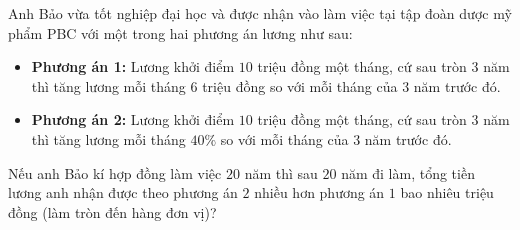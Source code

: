 \begin{ex}%
	Anh Bảo vừa tốt nghiệp đại học và được nhận vào làm việc tại tập đoàn dược mỹ phẩm PBC với một trong hai phương án lương như sau:
	\begin{itemize}
		\item \textbf{Phương án 1:} Lương khởi điểm $10$ triệu đồng một tháng, cứ sau tròn $3$ năm thì tăng lương mỗi tháng $6$ triệu đồng so với mỗi tháng của $3$ năm trước đó.
		\item \textbf{Phương án 2:} Lương khởi điểm $10$ triệu đồng một tháng, cứ sau tròn $3$ năm thì tăng lương mỗi tháng $40\%$ so với mỗi tháng của $3$ năm trước đó.
	\end{itemize}
	Nếu anh Bảo kí hợp đồng làm việc $20$ năm thì sau $20$ năm đi làm, tổng tiền lương anh nhận được theo phương án $2$ nhiều hơn phương án $1$ bao nhiêu triệu đồng (làm tròn đến hàng đơn vị)?
\end{ex}

